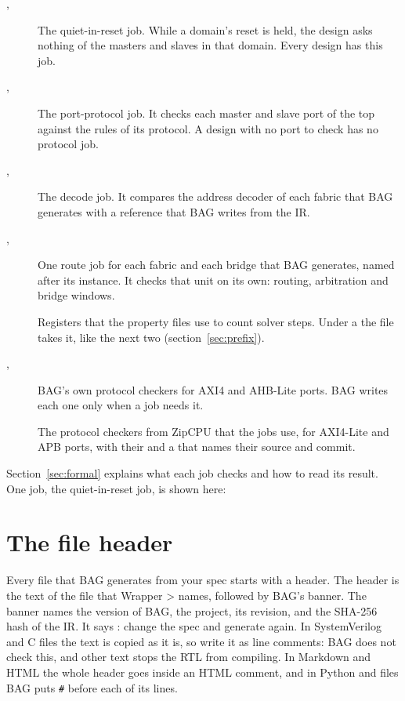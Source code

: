 \begin{description}
\item[, ] The quiet-in-reset job. While a
  domain's reset is held, the design asks nothing of the masters and slaves in that
  domain. Every design has this job.
\item[, ] The port-protocol job. It checks
  each master and slave port of the top against the rules of its protocol. A design
  with no port to check has no protocol job.
\item[, ] The decode job. It compares the
  address decoder of each fabric that BAG generates with a reference that BAG writes from the IR.
\item[, ] One route job for each fabric
  and each bridge that BAG generates, named after its instance. It checks that unit on its own: routing,
  arbitration and bridge windows.
\item[] Registers that the property files use to count solver
  steps. Under a  the file takes it, like the next two
  (section~\ref{sec:prefix}).
\item[, ] BAG's own protocol checkers
  for AXI4 and AHB-Lite ports. BAG writes each one only when a job needs it.
\item[] The protocol checkers from ZipCPU that the jobs use,
  for AXI4-Lite and APB ports, with their  and a  that
  names their source and commit.
\end{description}

Section~\ref{sec:formal} explains what each job checks and how to read its result. One
job, the quiet-in-reset job, is shown here:



\section{The file header}
\label{sec:header}

Every file that BAG generates from your spec starts with a header. The header is the
text of the file that Wrapper >  names, followed by BAG's banner. The banner names the version of BAG, the project, its revision, and the SHA-256
hash of the IR. It says : change the spec and generate again. In SystemVerilog and C files the text is copied as it is, so write it as \code{//}
line comments: BAG does not check this, and other text stops the RTL from compiling. In
Markdown and HTML the whole header goes inside an HTML comment, and in Python and
 files BAG puts \texttt{\#} before each of its lines.

